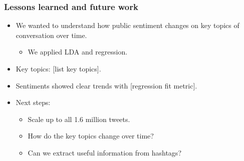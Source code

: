 \documentclass{beamer}
\begin{document}
\begin{frame}
\frametitle{Lessons learned and future work}
\begin{itemize}
\item We wanted to understand how public sentiment changes on key topics of conversation over time.
\begin{itemize}
\item We applied LDA and regression.
\end{itemize}
\item Key topics: [list key topics].
\item Sentiments showed clear trends with [regression fit metric].
\item Next steps:
\begin{itemize}
\item Scale up to all 1.6 million tweets.
\item How do the key topics change over time?
\item Can we extract useful information from hashtags?
\end{itemize}
\end{itemize}
\end{frame}
\end{document}

